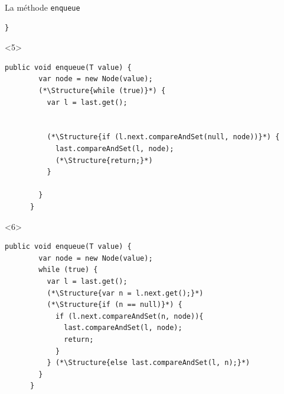 \begin{frame}[fragile]{La méthode \lstinline{enqueue}}
\begin{onlyenv}
\begin{lstlisting}[gobble=6]
      }
    \end{lstlisting}
  \end{onlyenv}
  \begin{onlyenv}<5>
    \begin{lstlisting}[gobble=6]
      public void enqueue(T value) {
        var node = new Node(value);
        (*\Structure{while (true)}*) {
          var l = last.get();


          (*\Structure{if (l.next.compareAndSet(null, node))}*) {
            last.compareAndSet(l, node);
            (*\Structure{return;}*)
          }
          
        }
      }
    \end{lstlisting}
  \end{onlyenv}
  \begin{onlyenv}<6>
    \begin{lstlisting}[gobble=6]
      public void enqueue(T value) {
        var node = new Node(value);
        while (true) {
          var l = last.get();
          (*\Structure{var n = l.next.get();}*)
          (*\Structure{if (n == null)}*) {
            if (l.next.compareAndSet(n, node)){
              last.compareAndSet(l, node);
              return;
            }
          } (*\Structure{else last.compareAndSet(l, n);}*)
        }
      }
    \end{lstlisting}
  \end{onlyenv}


\end{frame}
